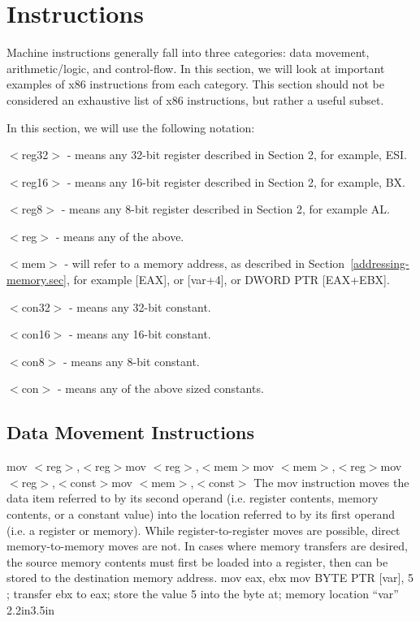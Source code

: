 \section{Instructions}

Machine instructions generally fall into three categories: data movement, arithmetic/logic,
and control-flow. In this section, we will look at important examples of x86 instructions from
each category. This section should not be considered an exhaustive list of x86 instructions, but
rather a useful subset.

In this section, we will use the following notation:

\begin{itemlist}
\item $<$reg32$>$ - means any 32-bit register described in Section 2, for example, ESI.
\item $<$reg16$>$ - means any 16-bit register described in Section 2, for example, BX.
\item $<$reg8$>$ - means any 8-bit register described in Section 2, for example AL.
\item $<$reg$>$ - means any of the above.
\item $<$mem$>$ - will refer to a memory address, as described in Section~\ref{addressing-memory.sec}, for example [EAX], or
[var+4], or DWORD PTR [EAX+EBX].
\item $<$con32$>$ - means any 32-bit constant.
\item $<$con16$>$ - means any 16-bit constant.
\item $<$con8$>$ - means any 8-bit constant.
\item $<$con$>$ - means any of the above sized constants.
\end{itemlist}

\subsection{Data Movement Instructions}
\label{data-movement-instructions.sec}

{mov $<$reg$>$,$<$reg$>$\newline mov $<$reg$>$,$<$mem$>$\newline mov $<$mem$>$,$<$reg$>$\newline mov $<$reg$>$,$<$const$>$\newline mov $<$mem$>$,$<$const$>$}
{The mov instruction moves the data item referred to by its second
  operand (i.e.  register contents, memory contents, or a constant
  value) into the location referred to by its first operand (i.e. a
  register or memory). While register-to-register moves are possible,
  direct memory-to-memory moves are not. In cases where memory
  transfers are desired, the source memory contents must first be
  loaded into a register, then can be stored to the destination memory
  address.}
{mov eax, ebx \linebreak mov BYTE PTR [var], 5 }
{; transfer ebx to eax\linebreak; store the value 5 into the byte at\linebreak; memory location ``var''}
{2.2in}{3.5in}

